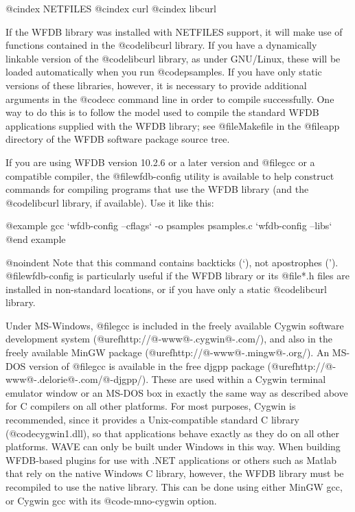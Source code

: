 {@cindex NETFILES
@cindex curl
@cindex libcurl

If the WFDB library was installed with NETFILES support, it will make use of
functions contained in the @code{libcurl} library.  If you have a dynamically
linkable version of the @code{libcurl} library, as under GNU/Linux, these will
be loaded automatically when you run @code{psamples}.  If you have only static
versions of these libraries, however, it is necessary to provide additional
arguments in the @code{cc} command line in order to compile successfully.  One
way to do this is to follow the model used to compile the standard WFDB
applications supplied with the WFDB library; see @file{Makefile} in the
@file{app} directory of the WFDB software package source tree.

If you are using WFDB version 10.2.6 or a later version and @file{gcc} or a
compatible compiler, the @file{wfdb-config} utility is available to help
construct commands for compiling programs that use the WFDB library (and the
@code{libcurl} library, if available).  Use it like this:

@example
gcc `wfdb-config --cflags` -o psamples psamples.c `wfdb-config --libs`
@end example

@noindent
Note that this command contains backticks (`), not apostrophes (').
@file{wfdb-config} is particularly useful if the WFDB library or
its @file{*.h} files are installed in non-standard locations, or if
you have only a static @code{libcurl} library.

Under MS-Windows, @file{gcc} is included in the freely available Cygwin
software development system (@uref{http://@-www@-.cygwin@-.com/}), and also in
the freely available MinGW package (@uref{http://@-www@-.mingw@-.org/}).  An
MS-DOS version of @file{gcc} is available in the free djgpp package
(@uref{http://@-www@-.delorie@-.com/@-djgpp/}). These are used within a Cygwin
terminal emulator window or an MS-DOS box in exactly the same way as described
above for C compilers on all other platforms.  For most purposes, Cygwin is
recommended, since it provides a Unix-compatible standard C library
(@code{cygwin1.dll}), so that applications behave exactly as they do on all
other platforms.  WAVE can only be built under Windows in this way.  When
building WFDB-based plugins for use with .NET applications or others such as
Matlab that rely on the native Windows C library, however, the WFDB library
must be recompiled to use the native library.  This can be done using either
MinGW gcc, or Cygwin gcc with its @code{-mno-cygwin} option.

}
